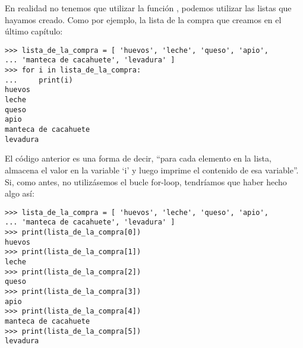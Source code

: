 \linebreak
\par
En realidad no tenemos que utilizar la función , podemos utilizar las listas que hayamos creado.  Como por ejemplo, la lista de la compra que creamos en el último capítulo:

\begin{listing}
\begin{verbatim}
>>> lista_de_la_compra = [ 'huevos', 'leche', 'queso', 'apio', 
... 'manteca de cacahuete', 'levadura' ]
>>> for i in lista_de_la_compra:
...     print(i)
huevos
leche
queso
apio
manteca de cacahuete
levadura
\end{verbatim}
\end{listing}

El código anterior es una forma de decir, ``para cada elemento en la lista, almacena el valor en la variable `i' y luego imprime el contenido de esa variable''.  Si, como antes, no utilizásemos el bucle for-loop, tendríamos que haber hecho algo así:

\begin{listing}
\begin{verbatim}
>>> lista_de_la_compra = [ 'huevos', 'leche', 'queso', 'apio', 
... 'manteca de cacahuete', 'levadura' ]
>>> print(lista_de_la_compra[0])
huevos
>>> print(lista_de_la_compra[1])
leche
>>> print(lista_de_la_compra[2])
queso
>>> print(lista_de_la_compra[3])
apio
>>> print(lista_de_la_compra[4])
manteca de cacahuete
>>> print(lista_de_la_compra[5])
levadura
\end{verbatim}
\end{listing}

